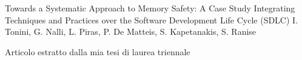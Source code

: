 
\begin{cventries}
  {Towards a Systematic Approach to Memory Safety: A Case Study Integrating Techniques and Practices over the Software Development Life Cycle (SDLC)} %
  {I. Tonini, G. Nalli, L. Piras, P. De Matteis, S. Kapetanakis, S. Ranise} %
  {} %
  { \begin{cvitems} %
  \item {Articolo estratto dalla mia tesi di laurea triennale}\end{cvitems} }
\end{cventries}